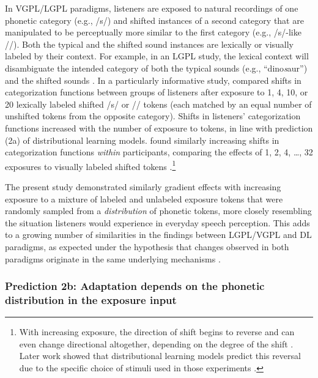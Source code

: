 \documentclass[
  11pt,
  man,mask,floatsintext]{apa6}
\begin{document}
In VGPL/LGPL paradigms, listeners are exposed to natural recordings of one phonetic category (e.g., /s/) and shifted instances of a second category that are manipulated to be perceptually more similar to the first category (e.g., /s/-like //). Both the typical and the shifted sound instances are lexically or visually labeled by their context. For example, in an LGPL study, the lexical context will disambiguate the intended category of both the typical sounds (e.g., ``dino\emph{s}aur'') and the shifted sounds \autocites[e.g., ``medi\emph{sh}ine'',][]{norris2003,eisner-mcqueen2005,kraljic-samuel2005}.
In a particularly informative study, \textcite{cummings-theodore2023} compared shifts in categorization functions between groups of listeners after exposure to 1, 4, 10, or 20 lexically labeled shifted /s/ or // tokens (each matched by an equal number of unshifted tokens from the opposite category). Shifts in listeners' categorization functions increased with the number of exposure to tokens, in line with prediction (2a) of distributional learning models. \textcite{vroomen2007} found similarly increasing shifts in categorization functions \emph{within} participants, comparing the effects of 1, 2, 4, \ldots, 32 exposures to visually labeled shifted tokens \autocite[see also][]{kleinschmidt-jaeger2012}.\footnote{With increasing exposure, the direction of shift begins to reverse \autocites[returning to baseline after 128-256 exposures,][]{kleinschmidt-jaeger2011,vroomen2007} and can even change directional altogether, depending on the degree of the shift \autocite{kleinschmidt-jaeger2012}. Later work showed that distributional learning models predict this reversal due to the specific choice of stimuli used in those experiments \autocite{kleinschmidt-jaeger2015}.}

The present study demonstrated similarly gradient effects with increasing exposure to a mixture of labeled and unlabeled exposure tokens that were randomly sampled from a \emph{distribution} of phonetic tokens, more closely resembling the situation listeners would experience in everyday speech perception. This adds to a growing number of similarities in the findings between LGPL/VGPL and DL paradigms, as expected under the hypothesis that changes observed in both paradigms originate in the same underlying mechanisms \autocites[see discussions in][]{kleinschmidt2015,zheng-samuel2020,xie2023}.

\subsubsection{Prediction 2b: Adaptation depends on the phonetic distribution in the exposure input}\label{prediction-2b-adaptation-depends-on-the-phonetic-distribution-in-the-exposure-input}
\end{document}
